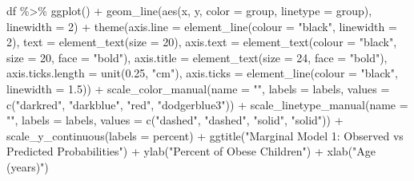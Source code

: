\documentclass[
  letterpaper,
  DIV=11,
  numbers=noendperiod]{scrreprt}
\newenvironment{Shaded}{\begin{snugshade}}{\end{snugshade}}
\newcommand{\AttributeTok}[1]{\textcolor[rgb]{0.40,0.45,0.13}{#1}}
\newcommand{\DecValTok}[1]{\textcolor[rgb]{0.68,0.00,0.00}{#1}}
\newcommand{\FloatTok}[1]{\textcolor[rgb]{0.68,0.00,0.00}{#1}}
\newcommand{\FunctionTok}[1]{\textcolor[rgb]{0.28,0.35,0.67}{#1}}
\newcommand{\NormalTok}[1]{\textcolor[rgb]{0.00,0.23,0.31}{#1}}
\newcommand{\SpecialCharTok}[1]{\textcolor[rgb]{0.37,0.37,0.37}{#1}}
\newcommand{\StringTok}[1]{\textcolor[rgb]{0.13,0.47,0.30}{#1}}
\begin{document}
\begin{Shaded}
\begin{Highlighting}[]
\NormalTok{df }\SpecialCharTok{\%\textgreater{}\%}
    \FunctionTok{ggplot}\NormalTok{() }\SpecialCharTok{+} \FunctionTok{geom\_line}\NormalTok{(}\FunctionTok{aes}\NormalTok{(x, y, }\AttributeTok{color =}\NormalTok{ group, }\AttributeTok{linetype =}\NormalTok{ group), }\AttributeTok{linewidth =} \DecValTok{2}\NormalTok{) }\SpecialCharTok{+}
    \FunctionTok{theme}\NormalTok{(}\AttributeTok{axis.line =} \FunctionTok{element\_line}\NormalTok{(}\AttributeTok{colour =} \StringTok{"black"}\NormalTok{, }\AttributeTok{linewidth =} \DecValTok{2}\NormalTok{), }\AttributeTok{text =} \FunctionTok{element\_text}\NormalTok{(}\AttributeTok{size =} \DecValTok{20}\NormalTok{),}
        \AttributeTok{axis.text =} \FunctionTok{element\_text}\NormalTok{(}\AttributeTok{colour =} \StringTok{"black"}\NormalTok{, }\AttributeTok{size =} \DecValTok{20}\NormalTok{, }\AttributeTok{face =} \StringTok{"bold"}\NormalTok{), }\AttributeTok{axis.title =} \FunctionTok{element\_text}\NormalTok{(}\AttributeTok{size =} \DecValTok{24}\NormalTok{,}
            \AttributeTok{face =} \StringTok{"bold"}\NormalTok{), }\AttributeTok{axis.ticks.length =} \FunctionTok{unit}\NormalTok{(}\FloatTok{0.25}\NormalTok{, }\StringTok{"cm"}\NormalTok{), }\AttributeTok{axis.ticks =} \FunctionTok{element\_line}\NormalTok{(}\AttributeTok{colour =} \StringTok{"black"}\NormalTok{,}
            \AttributeTok{linewidth =} \FloatTok{1.5}\NormalTok{)) }\SpecialCharTok{+} \FunctionTok{scale\_color\_manual}\NormalTok{(}\AttributeTok{name =} \StringTok{""}\NormalTok{, }\AttributeTok{labels =}\NormalTok{ labels, }\AttributeTok{values =} \FunctionTok{c}\NormalTok{(}\StringTok{"darkred"}\NormalTok{,}
    \StringTok{"darkblue"}\NormalTok{, }\StringTok{"red"}\NormalTok{, }\StringTok{"dodgerblue3"}\NormalTok{)) }\SpecialCharTok{+} \FunctionTok{scale\_linetype\_manual}\NormalTok{(}\AttributeTok{name =} \StringTok{""}\NormalTok{, }\AttributeTok{labels =}\NormalTok{ labels,}
    \AttributeTok{values =} \FunctionTok{c}\NormalTok{(}\StringTok{"dashed"}\NormalTok{, }\StringTok{"dashed"}\NormalTok{, }\StringTok{"solid"}\NormalTok{, }\StringTok{"solid"}\NormalTok{)) }\SpecialCharTok{+} \FunctionTok{scale\_y\_continuous}\NormalTok{(}\AttributeTok{labels =}\NormalTok{ percent) }\SpecialCharTok{+}
    \FunctionTok{ggtitle}\NormalTok{(}\StringTok{"Marginal Model 1: Observed vs Predicted Probabilities"}\NormalTok{) }\SpecialCharTok{+} \FunctionTok{ylab}\NormalTok{(}\StringTok{"Percent of Obese Children"}\NormalTok{) }\SpecialCharTok{+}
    \FunctionTok{xlab}\NormalTok{(}\StringTok{"Age (years)"}\NormalTok{)}
\end{Highlighting}
\end{Shaded}
\end{document}
